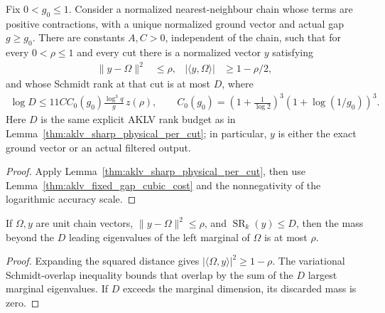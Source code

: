 \begin{lemma}
    \label{thm:aklv_fixed_gap_physical_per_cut}
    \leanok
    Fix $0<g_0\le1$.  Consider a normalized nearest-neighbour chain whose
    terms are positive contractions, with a unique normalized ground vector
    and actual gap $g\ge g_0$.  There are constants $A,C>0$, independent of
    the chain, such that for every $0<\rho\le1$ and every cut there is a
    normalized vector $y$ satisfying
    \begin{align*}
        \lVert y-\Omega\rVert^2   & \le\rho,     &
        |\langle y,\Omega\rangle| & \ge1-\rho/2,
    \end{align*}
    and whose Schmidt rank at that cut is at most $D$, where
    \begin{align*}
        \log D\le 11C C_0(g_0)\frac{\log^3q}{g}\,z(\rho),
        \qquad
        C_0(g_0)=\left(1+\frac1{\log2}\right)^3
        \left(1+\log(1/g_0)\right)^3.
    \end{align*}
    Here $D$ is the same explicit AKLV rank budget as in
    Lemma~\ref{thm:aklv_sharp_physical_per_cut}; in particular, $y$ is
    either the exact ground vector or an actual filtered output.
\end{lemma}
\begin{proof}
    \leanok
    Apply Lemma~\ref{thm:aklv_sharp_physical_per_cut}, then use
    Lemma~\ref{thm:aklv_fixed_gap_cubic_cost} and the nonnegativity of the
    logarithmic accuracy scale.
\end{proof}

\begin{lemma}
    \label{thm:aklv_cut_approximation_tail}
    \leanok
    If $\Omega,y$ are unit chain vectors, $\|y-\Omega\|^2\le\rho$,
    and $\operatorname{SR}_k(y)\le D$, then the mass beyond the $D$
    leading eigenvalues of the left marginal of $\Omega$ is at most $\rho$.
\end{lemma}
\begin{proof}
    \leanok
    Expanding the squared distance gives
    $|\langle\Omega,y\rangle|^2\ge1-\rho$.
    The variational Schmidt-overlap inequality bounds that overlap by
    the sum of the $D$ largest marginal eigenvalues. If $D$ exceeds the
    marginal dimension, its discarded mass is zero.
\end{proof}

